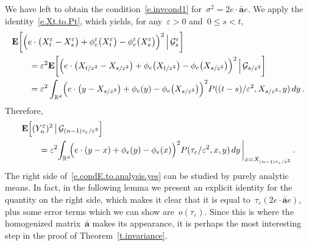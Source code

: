 \documentclass[11pt,twoside]{article} %
\numberwithin{equation}{section}
\theoremstyle{definition}
\newcommand*{\Rd}{\ensuremath{\mathbb{R}^d}}
\newcommand{\eps}{\varepsilon}
\newcommand{\ep}{\eps}
\renewcommand{\a}{\mathbf{a}}
\newcommand{\ahom}{\bar{\a}}
\begin{document}
We have left to obtain the condition~\eqref{e.invcond1} for~$\sigma^2 = 2e \cdot \ahom e$. 
We apply the identity~\eqref{e.Xt.to.Pt}, which yields, for any~$\ep>0$ and~$0\leq s<t$, 
\begin{align*}
\lefteqn{ 
\mathbf{E} 
\biggl[ 
\Bigl(
e \cdot \bigl( X^{\ep}_{t} - X^{\ep}_{s} \bigr)  
+ 
\phi^\ep_{e}\bigl(X^{\ep}_{t}\bigr) - \phi^\ep_{e}\bigl(X^{\ep}_{s}\bigr)
\Bigr)^2
\, \Bigl|\, \mathcal{G}^\ep_s
\biggr]
} \qquad & 
\\ & 
=
\ep^2 
\mathbf{E} 
\biggl[ 
\Bigl(
e \cdot \bigl( X_{t/\ep^2} - X_{s/\ep^2} \bigr)  
+ 
\phi_{e}\bigl(X_{t/\ep^2}\bigr) - \phi_{e}\bigl(X_{s/\ep^2}\bigr)
\Bigr)^2
\, \Bigl|\, \mathcal{G}_{s/\ep^2}
\biggr]
\\ &  
=
\ep^2 \int_{\Rd} 
\Bigl( e\cdot \bigl(y- X_{s/\ep^2}\bigr) + \phi_e(y) - \phi_e\bigl(X_{s/\ep^2}\bigr) \Bigr)^2
P( (t-s)/\ep^2 , X_{s/\ep^2} ,y)\,dy 
\,.
\end{align*}
Therefore, 
\begin{align}
\label{e.condE.to.analysis.yes}
\lefteqn{
\mathbf{E} \Bigl[ (Y_{n}^\ep )^2 \, \big\vert \, \mathcal{G}_{(n-1)\tau_\ep/\ep^2} \Bigr] 
} \qquad & 
\notag \\ & 
=
\ep^2 
\! \int_{\Rd} \!
\Bigl( e\cdot (y- x) + \phi_e(y) - \phi_e(x) \Bigr)^2
P( \tau_\ep/\ep^2, x, y)\,dy \,
\biggr\vert_{x=X_{(n-1)\tau_\ep/\ep^2} }
\,.
\end{align}
The right side of~\eqref{e.condE.to.analysis.yes} can be studied by purely analytic means. In fact, in the following lemma we present an explicit identity for the quantity on the right side, which makes it clear that it is equal to~$\tau_\ep (2e\cdot \ahom e)$, plus some error terms which we can show are~$o(\tau_\ep)$. 
Since this is where the homogenized matrix~$\ahom$ makes its appearance, it is perhaps the most interesting step in the proof of Theorem~\ref{t.invariance}.
\end{document}
